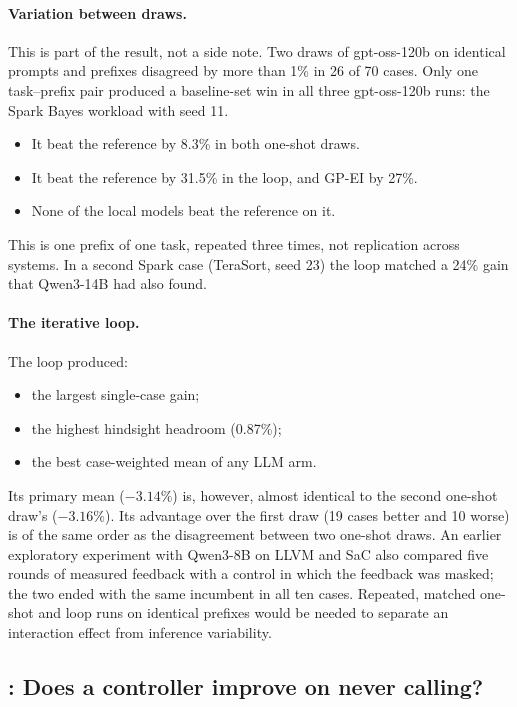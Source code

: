 \paragraph{Variation between draws.} This is part of the result, not a side note. Two draws of gpt-oss-120b on identical prompts and prefixes disagreed by more than 1\% in 26 of 70 cases. Only one task--prefix pair produced a baseline-set win in all three gpt-oss-120b runs: the Spark Bayes workload with seed 11.
\begin{itemize}
  \item It beat the reference by 8.3\% in both one-shot draws.
  \item It beat the reference by 31.5\% in the loop, and GP-EI by 27\%.
  \item None of the local models beat the reference on it.
\end{itemize}
This is one prefix of one task, repeated three times, not replication across systems. In a second Spark case (TeraSort, seed 23) the loop matched a 24\% gain that Qwen3-14B had also found.

\paragraph{The iterative loop.} The loop produced:
\begin{itemize}
  \item the largest single-case gain;
  \item the highest hindsight headroom (0.87\%);
  \item the best case-weighted mean of any LLM arm.
\end{itemize}
Its primary mean ($-3.14\%$) is, however, almost identical to the second one-shot draw's ($-3.16\%$). Its advantage over the first draw (19 cases better and 10 worse) is of the same order as the disagreement between two one-shot draws. An earlier exploratory experiment with Qwen3-8B on LLVM and SaC also compared five rounds of measured feedback with a control in which the feedback was masked; the two ended with the same incumbent in all ten cases. Repeated, matched one-shot and loop runs on identical prefixes would be needed to separate an interaction effect from inference variability.

\subsection{: Does a controller improve on never calling?}
\label{sec:rq4}

